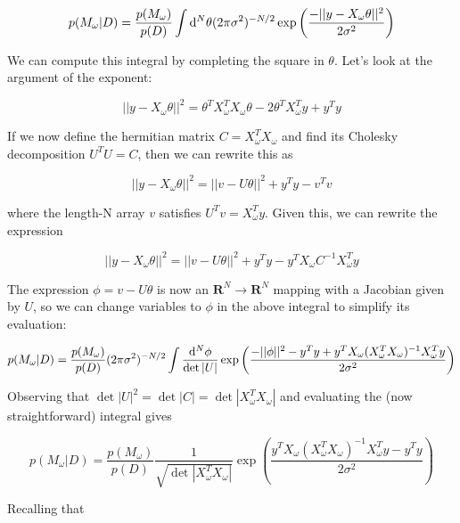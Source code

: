 \documentclass[12pt,pdftex]{article}
\begin{document}
\begin{equation}
  p(M_\omega|D) = \frac{p(M_\omega)}{p(D)}\int{\rm d}^N\theta(2\pi\sigma^2)^{-N/2}\exp\left(\frac{-||y - X_\omega\theta||^2}{2\sigma^2}\right)
\end{equation}

We can compute this integral by completing the square in $\theta$. Let's look at the argument of the exponent:

\begin{equation}
  ||y - X_\omega\theta||^2 = \theta^TX_\omega^TX_\omega\theta - 2\theta^TX_\omega^Ty + y^Ty
\end{equation}

If we now define the hermitian matrix $C = X_\omega^TX_\omega$ and find its Cholesky decomposition $U^TU = C$, then we can rewrite this as

\begin{equation}
  ||y - X_\omega\theta||^2 = ||v - U\theta||^2 + y^Ty - v^Tv
\end{equation}

where the length-N array $v$ satisfies $U^Tv = X_\omega^Ty$. Given this, we can rewrite the expression

\begin{equation}
  ||y - X_\omega\theta||^2 = ||v - U\theta||^2 + y^Ty - y^TX_\omega C^{-1}X_\omega^Ty
\end{equation}

The expression $\phi = v - U\theta$ is now an $\mathbf{R}^N\to\mathbf{R}^N$ mapping with a Jacobian given by $U$, so we can change variables to $\phi$ in the above integral to simplify its evaluation:

\begin{equation}
  p(M_\omega|D) = \frac{p(M_\omega)}{p(D)}(2\pi\sigma^2)^{-N/2}
\int\frac{{\rm d}^N\phi}{\det|U|}\exp\left(\frac{-||\phi||^2 - y^Ty + y^TX_\omega(X_\omega^TX_\omega)^{-1}X_\omega^Ty}{2\sigma^2}\right)
\end{equation}

Observing that $\det|U|^2 = \det|C| = \det|X_\omega^TX_\omega|$ and evaluating the (now straightforward) integral gives

\begin{equation}
  p(M_\omega|D) = \frac{p(M_\omega)}{p(D)}\frac{1}{\sqrt{\det|X_\omega^TX_\omega|}}
  \exp\left(\frac{y^TX_\omega(X_\omega^TX_\omega)^{-1}X_\omega^Ty - y^Ty}{2\sigma^2}\right)
\end{equation}

Recalling that
\end{document}
